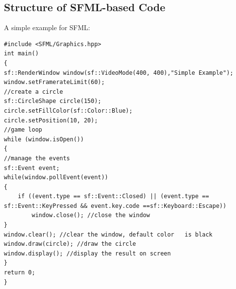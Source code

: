 \documentclass[main]{subfiles}
\begin{document}
\subsection{Structure of SFML-based Code}
A simple example for SFML:
\begin{verbatim}
#include <SFML/Graphics.hpp>
int main()
{
sf::RenderWindow window(sf::VideoMode(400, 400),"Simple Example");
window.setFramerateLimit(60);
//create a circle
sf::CircleShape circle(150);
circle.setFillColor(sf::Color::Blue);
circle.setPosition(10, 20);
//game loop
while (window.isOpen())
{
//manage the events
sf::Event event;
while(window.pollEvent(event))
{
    if ((event.type == sf::Event::Closed) || (event.type == sf::Event::KeyPressed && event.key.code ==sf::Keyboard::Escape))
        window.close(); //close the window
}
window.clear(); //clear the window, default color   is black
window.draw(circle); //draw the circle
window.display(); //display the result on screen
}
return 0;
}
\end{verbatim}
\end{document}
